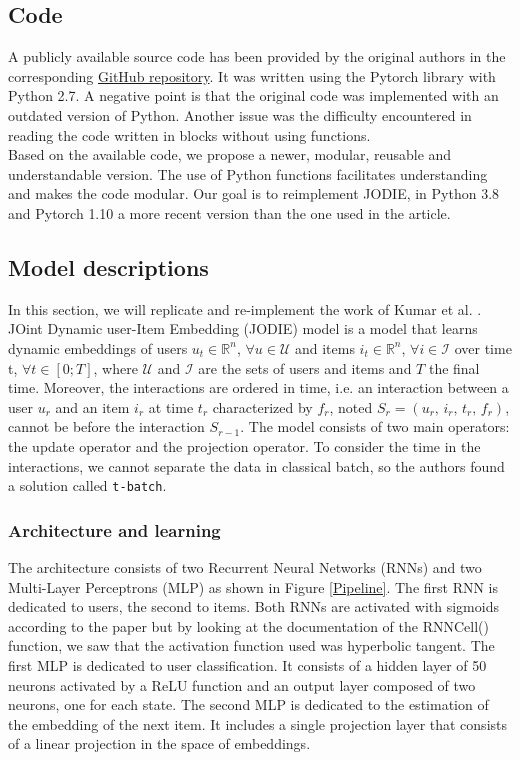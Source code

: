 \subsection*{Code}

A publicly available source code has been provided by the original authors in the corresponding \href{https://github.com/srijankr/jodie}{GitHub repository}. It was written using the Pytorch \supercite{NEURIPS2019_bdbca288} library with Python 2.7. A negative point is that the original code was implemented with an outdated version of Python. Another issue was the difficulty encountered in reading the code written in blocks without using functions.\\

Based on the available code, we propose a newer, modular, reusable and understandable version. The use of Python functions facilitates understanding and makes the code modular. Our goal is to reimplement JODIE, in Python 3.8 and Pytorch \supercite{NEURIPS2019_bdbca288} 1.10 a more recent version than the one used in the article.

\subsection*{Model descriptions}

In this section, we will replicate and re-implement the work of Kumar et al. \supercite{kumar2019predicting}. JOint Dynamic user-Item Embedding (JODIE) model is a model that learns dynamic embeddings of users $u_t \in \mathbb{R}^n$, $\forall u \in \mathcal{U}$ and items $i_t \in \mathbb{R}^n$, $\forall i \in \mathcal{I}$ over time t, $\forall t \in [0; T]$, where $\mathcal{U}$ and $\mathcal{I}$ are the sets of users and items and $T$ the final time. Moreover, the interactions are ordered in time, i.e. an interaction between a user $u_r$ and an item $i_r$ at time $t_r$ characterized by $f_r$, noted $S_r = (u_r, \, i_r, \, t_r, \, f_r)$, cannot be before the interaction $S_{r-1}$. The model consists of two main operators: the update operator and the projection operator. To consider the time in the interactions, we cannot separate the data in classical batch, so the authors found a solution called \texttt{t-batch}.

\subsubsection{Architecture and learning}

The architecture consists of two Recurrent Neural Networks (RNNs) and two Multi-Layer Perceptrons (MLP) as shown in Figure \ref{Pipeline}. The first RNN is dedicated to users, the second to items. Both RNNs are activated with sigmoids according to the paper but by looking at the documentation of the RNNCell() function, we saw that the activation function used was hyperbolic tangent. The first MLP is dedicated to user classification. It consists of a hidden layer of 50 neurons activated by a ReLU function and an output layer composed of two neurons, one for each state. The second MLP is dedicated to the estimation of the embedding of the next item. It includes a single projection layer that consists of a linear projection in the space of embeddings.

